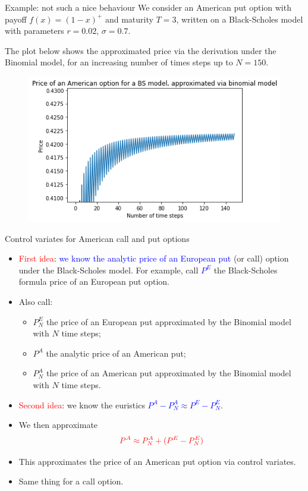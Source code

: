 \documentclass[9 pt]{beamer} %
\def \blue {\textcolor{blue}}
\def \red {\textcolor{red}}
\begin{document}
\begin{frame}{Example: not such a nice behaviour}
We consider an American put option with payoff $f(x)=(1-x)^+$ and maturity $T=3$, written on a Black-Scholes model with parameters $r=0.02$, $\sigma=0.7$.

The plot below shows the approximated price via the derivation under the Binomial model, for an increasing number of times steps up to $N=150$.  
 \begin{figure}
\centering
 \includegraphics[scale=0.65]{american.png}
\end{figure}
\end{frame}


\begin{frame}{Control variates for American call and put options}
\begin{itemize}
\item \red{First idea}: \blue{we know the analytic price of an European put} (or call) option under the Black-Scholes model. For example, call \blue{$P^E$} the Black-Scholes formula price of an European put option.
\item Also call:
\begin{itemize}
\item $P^E_N$ the price of an European put approximated by the Binomial model with $N$ time steps;
\item $P^A$ the analytic price of an American put;
\item $P^A_N$ the price of an American put approximated by the Binomial model with $N$ time steps.
\end{itemize}
\item \red{Second idea}: we know the euristics \blue{$P^A-P^A_N \approx P^E-P^E_N$}.
\item We then approximate
$$
\red{P^A \approx P^A_N + (P^E-P^E_N)}
$$
\item This approximates the price of an American put option via control variates.
\item Same thing for a call option.
\end{itemize}
\end{frame}
\end{document}
